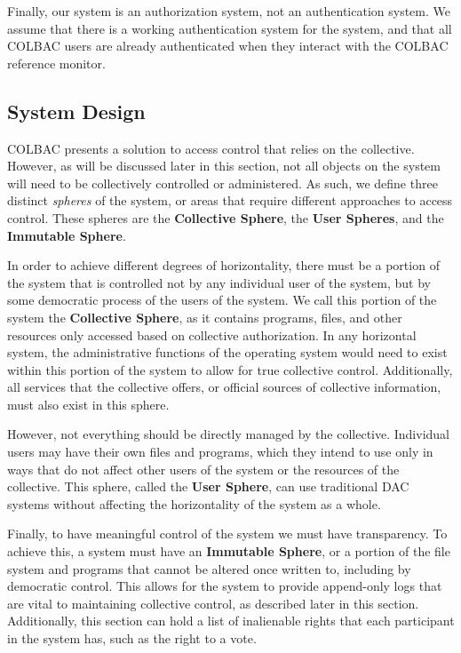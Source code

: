 Finally, our system is an authorization system, not an authentication system. We
assume that there is a working authentication system for the system, and that
all COLBAC users are already authenticated when they interact with the COLBAC
reference monitor.
\vspace{-.5em}
\subsection{System Design}
\label{sec:colbacdesign}
COLBAC presents a solution to access control that relies on the collective.
However, as will be discussed later in this section, not all objects on the
system will need to be collectively controlled or administered. As such, we
define three distinct \textit{spheres} of the system, or areas that require
different approaches to access control. These spheres are the \textbf{Collective
Sphere}, the \textbf{User Spheres}, and the \textbf{Immutable Sphere}.

In order to achieve different degrees of horizontality, there must be a portion
of the system that is controlled not by any individual user of the system, but
by some democratic process of the users of the system. We call this portion of
the system the \textbf{Collective Sphere}, as it contains programs, files, and
other resources only accessed based on collective authorization. In any
horizontal system, the administrative functions of the operating system would
need to exist within this portion of the system to allow for true collective
control. Additionally, all services that the collective offers, or official
sources of collective information, must also exist in this sphere.

However, not everything should be directly managed by the collective. Individual
users may have their own files and programs, which they intend to use only in
ways that do not affect other users of the system or the resources of the
collective. This sphere, called the \textbf{User Sphere}, can use traditional
DAC systems without affecting the horizontality of the system as a whole.

Finally, to have meaningful control of the system we must have transparency. To
achieve this, a system must have an \textbf{Immutable Sphere}, or a portion of
the file system and programs that cannot be altered once written to, including
by democratic control. This allows for the system to provide append-only logs
that are vital to maintaining collective control, as described later in this
section. Additionally, this section can hold a list of inalienable rights that
each participant in the system has, such as the right to a vote.

